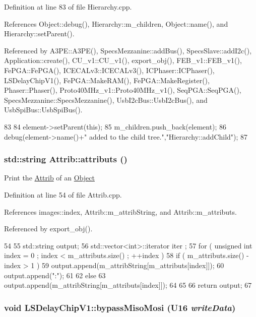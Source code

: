 Definition at line 83 of file Hierarchy.cpp.

References Object::debug(), Hierarchy::m\_\-children, Object::name(), and Hierarchy::setParent().

Referenced by A3PE::A3PE(), SpecsMezzanine::addBus(), SpecsSlave::addI2c(), Application::create(), CU\_\-v1::CU\_\-v1(), export\_\-obj(), FEB\_\-v1::FEB\_\-v1(), FePGA::FePGA(), ICECALv3::ICECALv3(), ICPhaser::ICPhaser(), LSDelayChipV1(), FePGA::MakeRAM(), FePGA::MakeRegister(), Phaser::Phaser(), Proto40MHz\_\-v1::Proto40MHz\_\-v1(), SeqPGA::SeqPGA(), SpecsMezzanine::SpecsMezzanine(), UsbI2cBus::UsbI2cBus(), and UsbSpiBus::UsbSpiBus().


\begin{DoxyCode}
83                                           {
84   element->setParent(this);
85   m_children.push_back(element);
86   debug(element->name()+" added to the child tree.","Hierarchy::addChild");
87 }
\end{DoxyCode}
\hypertarget{classAttrib_aee7bbf16b144887f196e1341b24f8a26}{
\subsubsection[{attributs}]{\setlength{\rightskip}{0pt plus 5cm}std::string Attrib::attributs ()}}
\label{classAttrib_aee7bbf16b144887f196e1341b24f8a26}
Print the \hyperlink{classAttrib}{Attrib} of an \hyperlink{classObject}{Object} 

Definition at line 54 of file Attrib.cpp.

References images::index, Attrib::m\_\-attribString, and Attrib::m\_\-attributs.

Referenced by export\_\-obj().


\begin{DoxyCode}
54                             {
55   std::string output;
56   std::vector<int>::iterator iter ;
57   for ( unsigned int index = 0 ; index < m_attributs.size() ; ++index ) {
58     if ( m_attributs.size() - index > 1 ) {
59       output.append(m_attribString[m_attributs[index]]);
60       output.append(":");
61     }
62     else {
63       output.append(m_attribString[m_attributs[index]]);
64     }
65   }
66   return output;
67 }
\end{DoxyCode}
\hypertarget{classLSDelayChipV1_a9e04b654e8d6d63efe23fc3b31e15ce6}{
\subsubsection[{bypassMisoMosi}]{\setlength{\rightskip}{0pt plus 5cm}void LSDelayChipV1::bypassMisoMosi ({\bf U16} {\em writeData})}}
\label{classLSDelayChipV1_a9e04b654e8d6d63efe23fc3b31e15ce6}


